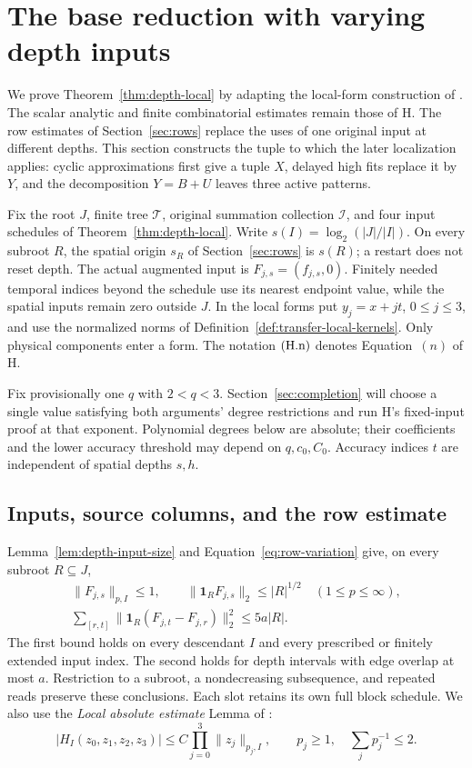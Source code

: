 \section{The base reduction with varying depth inputs}
\label{sec:base}

We prove Theorem~\ref{thm:depth-local} by adapting the local-form
construction of \cite[Sections~3--10]{H}.  The scalar analytic and
finite combinatorial estimates remain those of H.  The row estimates
of Section~\ref{sec:rows} replace the uses of one original input at
different depths.  This section constructs the tuple to which the
later localization applies: cyclic approximations first give a tuple
\(X\), delayed high fits replace it by \(Y\), and the decomposition
\(Y=B+U\) leaves three active patterns.

Fix the root \(J\), finite tree \(\mathcal T\), original summation
collection \(\mathcal I\), and four input schedules of
Theorem~\ref{thm:depth-local}.  Write
\(s(I)=\log_2(|J|/|I|)\).  On every subroot \(R\), the spatial origin
\(s_R\) of Section~\ref{sec:rows} is \(s(R)\); a restart does not reset
depth.  The actual augmented input is \(F_{j,s}=(f_{j,s},0)\).
Finitely needed temporal indices beyond the schedule use its nearest
endpoint value, while the spatial inputs remain zero outside \(J\).
In the local forms put \(y_j=x+jt\), \(0\le j\le3\), and use the
normalized norms of Definition~\ref{def:transfer-local-kernels}.
Only physical components enter a form.  The notation \(\textup{(H.n)}\)
denotes Equation~\((n)\) of H.

Fix provisionally one \(q\) with \(2<q<3\).  Section~\ref{sec:completion}
will choose a single value satisfying both arguments' degree restrictions
and run H's fixed-input proof at that exponent.  Polynomial degrees below are
absolute; their coefficients and the lower accuracy threshold may
depend on \(q,c_0,C_0\).  Accuracy indices \(t\) are independent of
spatial depths \(s,h\).

\subsection{Inputs, source columns, and the row estimate}

Lemma~\ref{lem:depth-input-size} and Equation~\eqref{eq:row-variation}
give, on every subroot \(R\subseteq J\),
\begin{gather}
 \|F_{j,s}\|_{p,I}\le1,\qquad
 \|\mathbf1_R F_{j,s}\|_2\le |R|^{1/2}
 \quad(1\le p\le\infty),                                      \label{eq:h-input-size}\\
 \sum_{[r,t]}\|\mathbf1_R(F_{j,t}-F_{j,r})\|_2^2
       \le5a|R|.                                               \label{eq:h-input-variation}
\end{gather}
The first bound holds on every descendant \(I\) and every prescribed
or finitely extended input index.  The second holds for depth intervals
with edge overlap at most \(a\).  Restriction to a subroot, a
nondecreasing subsequence, and repeated reads preserve these
conclusions.  Each slot retains its own full block schedule.  We also
use the \emph{Local absolute estimate} Lemma of \cite[Section~2]{H}:
\[
 |H_I(z_0,z_1,z_2,z_3)|
 \le C\prod_{j=0}^3\|z_j\|_{p_j,I},
 \qquad p_j\ge1,\quad \sum_jp_j^{-1}\le2.
\]

